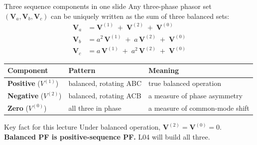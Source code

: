 \documentclass[aspectratio=169,10pt]{beamer}
\begin{document}
\begin{frame}{Three sequence components in one slide}
Any three-phase phasor set $(\mathbf{V}_a, \mathbf{V}_b, \mathbf{V}_c)$ can be uniquely written as the sum of three balanced sets:
\begin{align*}
\mathbf{V}_a &= \mathbf{V}^{(1)} \;+\; \mathbf{V}^{(2)} \;+\; \mathbf{V}^{(0)} \\
\mathbf{V}_b &= a^2\, \mathbf{V}^{(1)} \;+\; a\, \mathbf{V}^{(2)} \;+\; \mathbf{V}^{(0)} \\
\mathbf{V}_c &= a\, \mathbf{V}^{(1)} \;+\; a^2\, \mathbf{V}^{(2)} \;+\; \mathbf{V}^{(0)}
\end{align*}
\centering
\small
\begin{tabular}{lll}
\toprule
Component & Pattern & Meaning \\
\midrule
\textbf{Positive} ($V^{(1)}$) & balanced, rotating ABC & true balanced operation \\
\textbf{Negative} ($V^{(2)}$) & balanced, rotating ACB & a measure of phase asymmetry \\
\textbf{Zero} ($V^{(0)}$) & all three in phase & a measure of common-mode shift \\
\bottomrule
\end{tabular}
\vspace{0.3em}
\begin{block}{Key fact for this lecture}
Under balanced operation, $\mathbf{V}^{(2)} = \mathbf{V}^{(0)} = 0$. \textbf{Balanced PF is positive-sequence PF.} L04 will build all three.
\end{block}
\end{frame}
\end{document}
